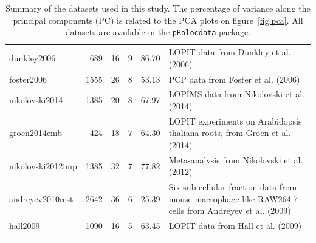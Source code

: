 \documentclass[12pt]{article}\usepackage[]{graphicx}\usepackage[]{color}
\newcommand{\Rpackage}[1]{\texttt{#1}}
\newcommand\Biocpkg[1]{%
  {\href{http://bioconductor.org/packages/#1}%
    {\Rpackage{#1}}}}
\newcommand\Biocexptpkg[1]{\Biocpkg{#1}}
\begin{document}
\begin{tiny}
\begin{table}
\begin{longtable}{lrrrrp{8cm}}
  dunkley2006 & 689 &  16 &   9 & 86.70 & LOPIT data from Dunkley et al. (2006) \citep{Dunkley:2006} \\ 
  foster2006 & 1555 &  26 &   8 & 53.13 & PCP data from Foster et al. (2006) \citep{Foster:2006} \\ 
  nikolovski2014 & 1385 &  20 &   8 & 67.97 & LOPIMS data from Nikolovski et al. (2014) \citep{Nikolovski:2014} \\ 
  groen2014cmb & 424 &  18 &   7 & 64.30 & LOPIT experiments on Arabidopsis thaliana roots, from Groen et al. (2014) \citep{Groen:2014} \\ 
  nikolovski2012imp & 1385 &  32 &   7 & 77.82 & Meta-analysis from Nikolovski et al. (2012) \citep{Nikolovski:2012} \\ 
  andreyev2010rest & 2642 &  36 &   6 & 25.39 & Six sub-cellular fraction data from mouse macrophage-like RAW264.7 cells from Andreyev et al. (2009) \citep{Andreyev:2010} \\ 
  hall2009 & 1090 &  16 &   5 & 63.45 & LOPIT data from Hall et al. (2009) \citep{Hall:2009} \\ 
   \bottomrule
\caption{Summary of the datasets used in this study. The percentage of variance along the principal components (PC) is related to the PCA plots on figure~\ref{fig:pca}. All datasets are available in the \Biocexptpkg{pRolocdata} package.} 
\label{tab:pdtab}
\end{longtable}

\end{table}
\end{tiny}
\end{document}
